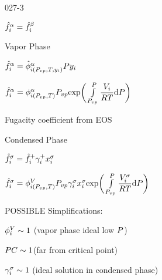 \begin{mitframe}{027-3} %

\begin{listone}
\item$\hat{\fug}_{\state}^{\tdiff}=\hat{\fug}_{\state}^{\texpcoeff}$

\item Vapor Phase

		\begin{listtwo}
        	\item$\hat{\fug}_{\state}^{\tdiff}=\hat{\eleccoeff}_{\state(\p_{vp},\Temp,y_{\state})}^{\tdiff}\p{y}_{\state}$
            
            \item$\hat{\fug}_{\state}^{\tdiff}=\eleccoeff_{\state(\p_{vp},\Temp)}^{\tdiff}\p_{vp}\text{exp}\bigg(\int\limits_{\p_{vp}}^{\p}\dfrac{\vol_{\state}}{\gasconst\Temp}\mathrm{d}\p\bigg)$

					\begin{listthree}
                    
                    	\item Fugacity coefficient from EOS 

                    \end{listthree}
		\end{listtwo}
       

\item Condensed Phase
    
        \begin{listtwo}
         \item$\hat{\fug}_{\state}^{\molecrad}=\hat{\fug}_{\state}^{+}\actcoeff^{+}\specfrac{i}^{\molecrad}$
         
         \item$\hat{\fug}_{\state}^{\molecrad}=\eleccoeff_{\state(\p_{vp},\Temp)}^{\vol}\p_{vp}\actcoeff^{\molecrad}\specfrac{i}^{\molecrad}\text{exp}\bigg(\int\limits_{\p_{vp}}^{\p}\dfrac{\vol_{\state}^{\molecrad}}{\gasconst\Temp}\mathrm{d}\p\bigg)$
  				 \begin{listthree}
                 \item POSSIBLE Simplifications:

							\begin{listfour}
                            \item$\eleccoeff_{\state}^{\vol}\sim{1}$ (vapor phase ideal low $\p$)
                            \item$\p\conc\sim{1}$(far from critical point)
                            \item$\actcoeff^{\molecrad}\sim{1}$ (ideal solution in condensed phase)
                   
							\end{listfour}
				\end{listthree}   
   \end{listtwo}
     
\end{listone}

\end{mitframe}